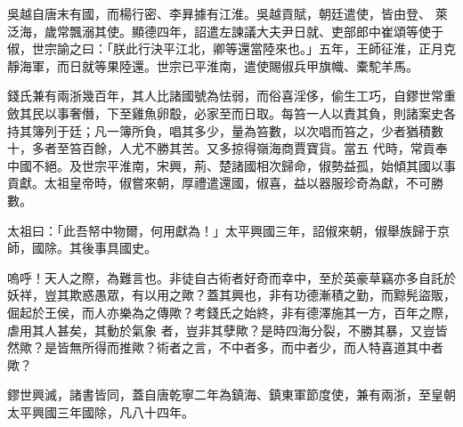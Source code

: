 \begin{pinyinscope}
 吳越自唐末有國，而楊行密、李昪據有江淮。吳越貢賦，朝廷遣使，皆由登、
 萊泛海，歲常飄溺其使。顯德四年，詔遣左諫議大夫尹日就、吏部郎中崔頌等使于俶，世宗諭之曰：「朕此行決平江北，卿等還當陸來也。」五年，王師征淮，正月克靜海軍，而日就等果陸還。世宗已平淮南，遣使賜俶兵甲旗幟、橐駝羊馬。



 錢氏兼有兩浙幾百年，其人比諸國號為怯弱，而俗喜淫侈，偷生工巧，自鏐世常重斂其民以事奢僭，下至雞魚卵鷇，必家至而日取。每笞一人以責其負，則諸案史各持其簿列于廷；凡一簿所負，唱其多少，量為笞數，以次唱而笞之，少者猶積數十，多者至笞百餘，人尤不勝其苦。又多掠得嶺海商賈寶貨。當五
 代時，常貢奉中國不絕。及世宗平淮南，宋興，荊、楚諸國相次歸命，俶勢益孤，始傾其國以事貢獻。太祖皇帝時，俶嘗來朝，厚禮遣還國，俶喜，益以器服珍奇為獻，不可勝數。



 太祖曰：「此吾帑中物爾，何用獻為！」太平興國三年，詔俶來朝，俶舉族歸于京師，國除。其後事具國史。



 嗚呼！天人之際，為難言也。非徒自古術者好奇而幸中，至於英豪草竊亦多自託於妖祥，豈其欺惑愚眾，有以用之歟？蓋其興也，非有功德漸積之勤，而黥髡盜販，倔起於王侯，而人亦樂為之傳歟？考錢氏之始終，非有德澤施其一方，百年之際，虐用其人甚矣，其動於氣象
 者，豈非其孽歟？是時四海分裂，不勝其暴，又豈皆然歟？是皆無所得而推歟？術者之言，不中者多，而中者少，而人特喜道其中者歟？



 鏐世興滅，諸書皆同，蓋自唐乾寧二年為鎮海、鎮東軍節度使，兼有兩浙，至皇朝太平興國三年國除，凡八十四年。



\end{pinyinscope}
